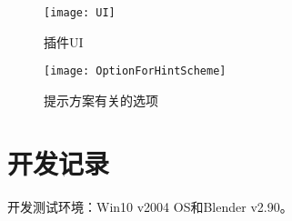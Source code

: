 \documentclass{../../PublicResources/DocClass}
\begin{document}
    \begin{figure}[htbp]
        \begin{minipage}[t]{0.45\textwidth}
            \texttt{[image: UI]}
            \caption*{插件UI}
        \end{minipage}
        \qquad
        \begin{minipage}[t]{0.45\textwidth}
            \texttt{[image: OptionForHintScheme]}
            \caption*{提示方案有关的选项}
        \end{minipage}
    \end{figure}



    \section{开发记录}

    开发测试环境：Win10 v2004 OS和Blender v2.90。
\end{document}
